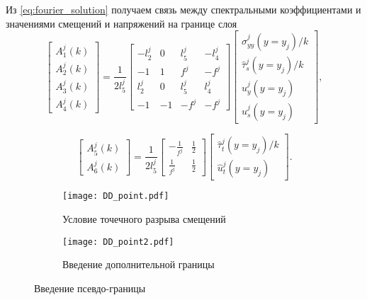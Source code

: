 Из \eqref{eq:fourier_solution} получаем связь между спектральными коэффициентами и значениями смещений и напряжений на границе слоя
\begin{equation}
    \label{eq:As}
    \left[
    \begin{array}{c}
    A^{j}_{1}(k) \\
    A^{j}_{2}(k)\\
    A^{j}_{3}(k) \\
    A^{j}_{4}(k)
    \end{array}
    \right]
    = \frac{1}{2l^j_5}
    \left[
    \begin{array}{cccc}
        -l^j_2 & 0 & l^j_5 & -l^j_4 \\
        -1 & 1 & f^j & -f^j \\
        l^j_2 & 0 & l^j_5 & l^j_4 \\
        -1 & -1 & -f^j & -f^j
    \end{array}
    \right]
    \left[
    \begin{array}{c}
    \hat{\sigma}^{j}_{yy}(y=y_j)/k \\
    \hat{\tau}^{j}_{s}(y=y_j)/k\\
    \hat{u}^{j}_{y}(y=y_j) \\
    \hat{u}^{j}_{s}(y=y_j) 
    \end{array}
    \right],
\end{equation}

\begin{equation}
    \label{eq:At}
    \left[
    \begin{array}{c}
        A^{j}_{5}(k) \\
        A^{j}_{6}(k)
    \end{array}
    \right]
    = \frac{1}{2l^j_5}
    \left[
    \begin{array}{cc}
        -\frac{1}{f^j} & \frac{1}{2} \\
        \frac{1}{f^j} & \frac{1}{2}
    \end{array}
    \right]
    \left[
    \begin{array}{c}
    \hat{\tau}^{j}_{t}(y=y_j)/k\\
    \hat{u}^{j}_{t}(y=y_j) 
    \end{array}
    \right].
\end{equation}

\begin{figure}[htbp]
    \centering
    \begin{subfigure}[b]{0.45\textwidth}
        \centering
        \caption{Условие точечного разрыва смещений}
        \label{fig:DD_point}
        \texttt{[image: DD\_point.pdf]}
    \end{subfigure}
    \hfill 
    \begin{subfigure}[b]{0.45\textwidth}
        \centering
        \caption{Введение дополнительной границы}
        \label{fig:pseudointerface}
        \texttt{[image: DD\_point2.pdf]}
    \end{subfigure}
    \caption{Введение псевдо-границы}
    \label{fig:Pseudointerface}
\end{figure}

